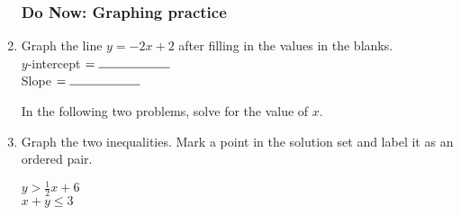 \documentclass[12pt, oneside]{article}
\begin{document}
  \begin{enumerate}
    \subsubsection*{Do Now: Graphing practice}

        \item Graph the line $y=-2 x +2$ after filling in the values in the blanks.\\[0.85cm]
              $y$-intercept $= \rule{2cm}{0.15mm}$ \\[0.5cm]
              Slope $= \rule{2cm}{0.15mm}$\\

        \begin{center} %
        \end{center}

        In the following two problems, solve for the value of $x$.

\newpage
\item Graph the two inequalities. Mark a point in the solution set and label it as an ordered pair.

  \begin{multicols}{2}
    $y > \frac{1}{2} x +6$ \\
    $x+y \leq 3$
  \end{multicols} \vspace{2cm}
  \begin{center} %
  \end{center}


\end{enumerate}
\end{document}
